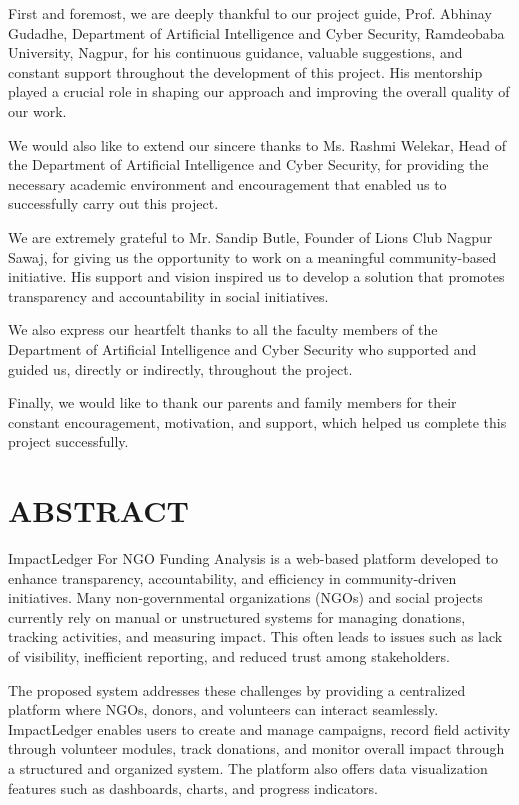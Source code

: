 \documentclass[12pt,a4paper]{article}
\begin{document}
First and foremost, we are deeply thankful to our project guide, Prof. Abhinay Gudadhe, Department of Artificial Intelligence and Cyber Security, Ramdeobaba University, Nagpur, for his continuous guidance, valuable suggestions, and constant support throughout the development of this project. His mentorship played a crucial role in shaping our approach and improving the overall quality of our work.

We would also like to extend our sincere thanks to Ms. Rashmi Welekar, Head of the Department of Artificial Intelligence and Cyber Security, for providing the necessary academic environment and encouragement that enabled us to successfully carry out this project.

We are extremely grateful to Mr. Sandip Butle, Founder of Lions Club Nagpur Sawaj, for giving us the opportunity to work on a meaningful community-based initiative. His support and vision inspired us to develop a solution that promotes transparency and accountability in social initiatives.

We also express our heartfelt thanks to all the faculty members of the Department of Artificial Intelligence and Cyber Security who supported and guided us, directly or indirectly, throughout the project.

Finally, we would like to thank our parents and family members for their constant encouragement, motivation, and support, which helped us complete this project successfully.

\newpage
\section{ABSTRACT}
ImpactLedger For NGO Funding Analysis is a web-based platform developed to enhance transparency, accountability, and efficiency in community-driven initiatives. Many non-governmental organizations (NGOs) and social projects currently rely on manual or unstructured systems for managing donations, tracking activities, and measuring impact. This often leads to issues such as lack of visibility, inefficient reporting, and reduced trust among stakeholders.

The proposed system addresses these challenges by providing a centralized platform where NGOs, donors, and volunteers can interact seamlessly. ImpactLedger enables users to create and manage campaigns, record field activity through volunteer modules, track donations, and monitor overall impact through a structured and organized system. The platform also offers data visualization features such as dashboards, charts, and progress indicators.
\end{document}
